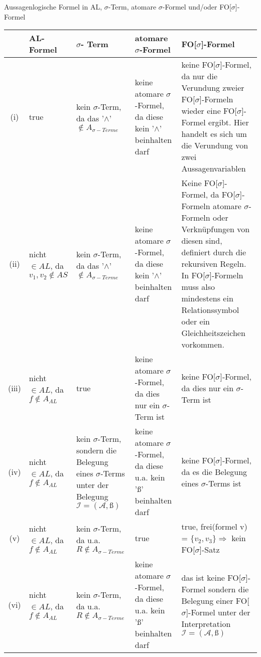 \documentclass[a4paper,10pt]{article}
\begin{document}
	\begin{compactenum} [(a)]
		\item Aussagenlogische Formel in AL, $\sigma $-Term, atomare $ \sigma $-Formel und/oder FO[$ \sigma $]-Formel \\
		
		\begin{tabular}  {c|L{3cm}|L{3cm}|L{4cm}|L{4cm}}
			& AL-Formel &$ \sigma $- Term & atomare $ \sigma $-Formel & FO[$ \sigma $]-Formel\\ \hline
			
			(i) &true& kein $ \sigma $-Term, da das '$ \wedge $'$ \not\in A_{\sigma -Terme}$ & keine atomare $ \sigma $-Formel, da diese kein '$ \wedge $' beinhalten darf & keine FO[$ \sigma $]-Formel, da nur die Verundung zweier FO[$ \sigma $]-Formeln wieder eine FO[$ \sigma $]-Formel ergibt. Hier handelt es sich um die Verundung von zwei Aussagenvariablen \\ \hline
			
			(ii) &nicht $ \in AL $, da $ v_1,v_2 \not\in AS$& kein $ \sigma $-Term, da das '$ \wedge $'$ \not\in A_{\sigma -Terme}$  & keine atomare $ \sigma $-Formel, da diese kein '$ \wedge $' beinhalten darf & Keine FO[$ \sigma $]-Formel, da FO[$ \sigma $]-Formeln atomare $ \sigma $-Formeln oder Verknüpfungen von diesen sind, definiert durch die rekursiven Regeln. In FO[$ \sigma $]-Formeln muss also mindestens ein Relationssymbol oder ein Gleichheitszeichen vorkommen. \\ \hline
			
			(iii) &nicht $ \in AL $, da $ f \not\in A_{AL} $& true & keine atomare $ \sigma $-Formel, da dies nur ein $ \sigma$-Term ist& keine FO[$ \sigma $]-Formel, da dies nur ein $ \sigma$-Term ist \\ \hline
			
			(iv) &nicht $ \in AL $, da $ f \not\in A_{AL} $& kein $ \sigma $-Term, sondern die Belegung eines $ \sigma $-Terms unter der Belegung $ \mathcal{I} = (\mathcal{A},ß)$ & keine atomare $ \sigma $-Formel, da diese u.a. kein 'ß' beinhalten darf & keine FO[$ \sigma $]-Formel, da es die Belegung eines $ \sigma $-Terms ist \\ \hline
			
			(v) &nicht $ \in AL $, da $ f \not\in A_{AL} $& kein $ \sigma $-Term, da u.a. $ R \not\in A_{\sigma -Terme}$ &true& true, frei(formel v) = $ \{v_2,v_3\} \Longrightarrow$ kein FO[$ \sigma $]-Satz \\ \hline
			
			(vi) & nicht $ \in AL $, da $ f \not\in A_{AL} $& kein $ \sigma $-Term, da u.a. $ R \not\in A_{\sigma -Terme}$ &keine atomare $ \sigma $-Formel, da diese u.a. kein 'ß' beinhalten darf& das ist keine FO[$ \sigma $]-Formel sondern die Belegung einer FO[$ \sigma $]-Formel unter der Interpretation $ \mathcal{I} = (\mathcal{A},ß)$\\ \hline
			

\end{tabular}
\end{compactenum}
\end{document}
